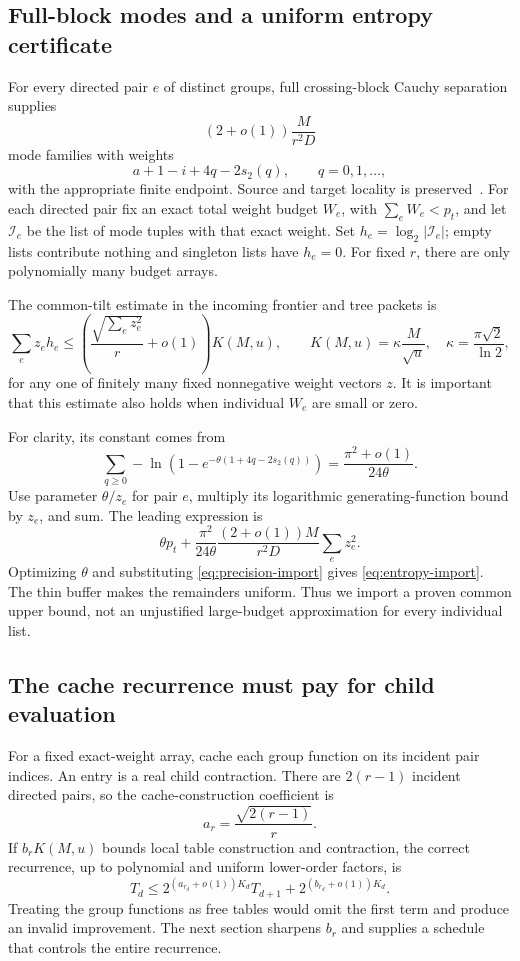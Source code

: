 \subsection{Full-block modes and a uniform entropy certificate}
For every directed pair $e$ of distinct groups, full crossing-block
Cauchy separation supplies
\[
 (2+o(1))\frac{M}{r^2D}
\]
mode families with weights
\[
 a+1-i+4q-2s_2(q),\qquad q=0,1,\ldots,
\]
with the appropriate finite endpoint. Source and target locality is
preserved~\cite{joint}. For each directed pair fix an exact total weight
budget $W_e$, with $\sum_eW_e<p_t$, and let $\mathcal I_e$ be the list
of mode tuples with that exact weight. Set $h_e=\log_2|\mathcal I_e|$;
empty lists contribute nothing and singleton lists have $h_e=0$.
For fixed $r$, there are only polynomially many budget arrays.

The common-tilt estimate in the incoming frontier and tree packets is
\begin{equation}\label{eq:entropy-import}
 \sum_e z_eh_e\le
 \left(\frac{\sqrt{\sum_e z_e^2}}r+o(1)\right)K(M,u),\qquad
 K(M,u)=\kappa\frac M{\sqrt u},\quad
 \kappa=\frac{\pi\sqrt2}{\ln2},
\end{equation}
for any one of finitely many fixed nonnegative weight vectors $z$.
It is important that this estimate also holds when individual $W_e$
are small or zero.

For clarity, its constant comes from
\[
 \sum_{q\ge0}-\ln(1-e^{-\theta(1+4q-2s_2(q))})
 =\frac{\pi^2+o(1)}{24\theta}.
\]
Use parameter $\theta/z_e$ for pair $e$, multiply its logarithmic
generating-function bound by $z_e$, and sum. The leading expression is
\[
 \theta p_t+
 \frac{\pi^2}{24\theta}\frac{(2+o(1))M}{r^2D}
 \sum_ez_e^2.
\]
Optimizing $\theta$ and substituting \eqref{eq:precision-import}
gives \eqref{eq:entropy-import}. The thin buffer makes the remainders
uniform. Thus we import a proven common upper bound, not an unjustified
large-budget approximation for every individual list.

\subsection{The cache recurrence must pay for child evaluation}
For a fixed exact-weight array, cache each group function on its incident
pair indices. An entry is a real child contraction. There are
$2(r-1)$ incident directed pairs, so the cache-construction coefficient is
\[
 a_r=\frac{\sqrt{2(r-1)}}r.
\]
If $b_rK(M,u)$ bounds local table construction and contraction, the
correct recurrence, up to polynomial and uniform lower-order factors, is
\begin{equation}\label{eq:charged-rec}
 T_d\le
 2^{(a_{r_d}+o(1))K_d}T_{d+1}
 +2^{(b_{r_d}+o(1))K_d}.
\end{equation}
Treating the group functions as free tables would omit the first term
and produce an invalid improvement. The next section sharpens $b_r$
and supplies a schedule that controls the entire recurrence.
